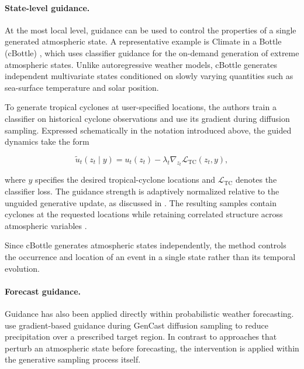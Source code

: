 \paragraph{State-level guidance.}

At the most local level, guidance can be used to control the properties of a
single generated atmospheric state. A representative example is Climate in a
Bottle (cBottle) \parencite{brenowitz2025climate}, which uses classifier
guidance for the on-demand generation of extreme atmospheric states. Unlike
autoregressive weather models, cBottle generates independent multivariate
states conditioned on slowly varying quantities such as sea-surface
temperature and solar position.

To generate tropical cyclones at user-specified locations, the authors train a
classifier on historical cyclone observations and use its gradient during
diffusion sampling. Expressed schematically in the notation introduced above,
the guided dynamics take the form

\begin{equation}
    \tilde{u}_t(z_t\mid y)
    =
    u_t(z_t)
    -
    \lambda_t
    \nabla_{z_t}
    \mathcal{L}_{\mathrm{TC}}(z_t,y),
    \label{eq:cbottle-guidance}
\end{equation}

where $y$ specifies the desired tropical-cyclone locations and
$\mathcal{L}_{\mathrm{TC}}$ denotes the classifier loss. The guidance strength
is adaptively normalized relative to the unguided generative update, as
discussed in . The resulting samples
contain cyclones at the requested locations while retaining correlated
structure across atmospheric variables \parencite{brenowitz2025climate}.

Since cBottle generates atmospheric states independently, the method controls
the occurrence and location of an event in a single state rather than its
temporal evolution.

\paragraph{Forecast guidance.}

Guidance has also been applied directly within probabilistic weather
forecasting. \textcite{ueyama2026guided} use gradient-based guidance during
GenCast diffusion sampling to reduce precipitation over a prescribed target
region. In contrast to approaches that perturb an atmospheric state before
forecasting, the intervention is applied within the generative sampling
process itself.

